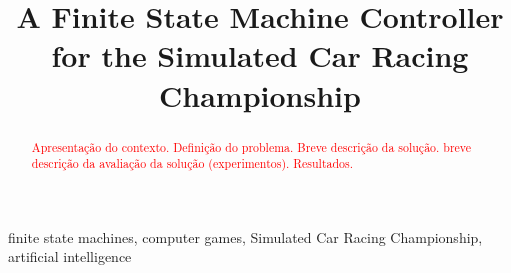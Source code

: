\documentclass[journal]{IEEEtran}%
\newcommand{\toDo}[1]{\textcolor{red}{#1}}%
\begin{document}
	\title{A Finite State Machine Controller for the Simulated Car Racing Championship}

\author{
	}

%
{}%

\maketitle

\begin{abstract}
\toDo{Apresentação do contexto. Definição do problema. Breve descrição da solução. breve descrição da avaliação da solução (experimentos). Resultados.}
\end{abstract}

\begin{IEEEkeywords}
finite state machines, computer games, Simulated Car Racing Championship, artificial intelligence
\end{IEEEkeywords}%

%
%
%
%
%

%
%
\end{document}
